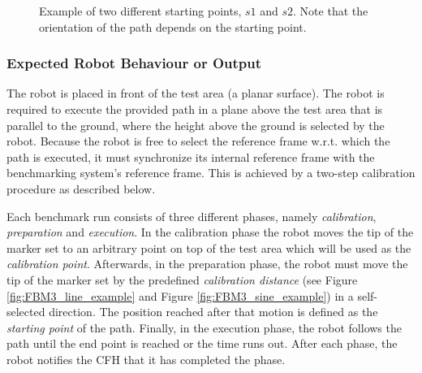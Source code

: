 \begin{figure}[!htbp]
	\begin{center}
		\caption{Example of two different starting points, $s1$ and $s2$. Note that the orientation of the path depends on the starting point.}
		\label{fig:FBM3_rotation_example}
	\end{center}
\end{figure}

\subsubsection{Expected Robot Behaviour or Output}
\label{sssec:ControlOutput}

The robot is placed in front of the test area (a planar surface). The robot is required to execute the provided path in a plane above the test area that is parallel to the ground, where the height above the ground is selected by the robot. Because the robot is free to select the reference frame w.r.t. which the path is executed, it must synchronize its internal reference frame with the benchmarking system's reference frame. This is achieved by a two-step calibration procedure as described below.

Each benchmark run consists of three different phases, namely \emph{calibration}, \emph{preparation} and \emph{execution}. In the calibration phase the robot moves the tip of the marker set to an arbitrary point on top of the test area which will be used as the \emph{calibration point}. Afterwards, in the preparation phase, the robot must move the tip of the marker set by the predefined \emph{calibration distance} (see Figure \ref{fig:FBM3_line_example} and Figure \ref{fig:FBM3_sine_example}) in a self-selected direction. The position reached after that motion is defined as the \emph{starting point} of the path. Finally, in the execution phase, the robot follows the path until the end point is reached or the time runs out. After each phase, the robot notifies the CFH that it has completed the phase.

